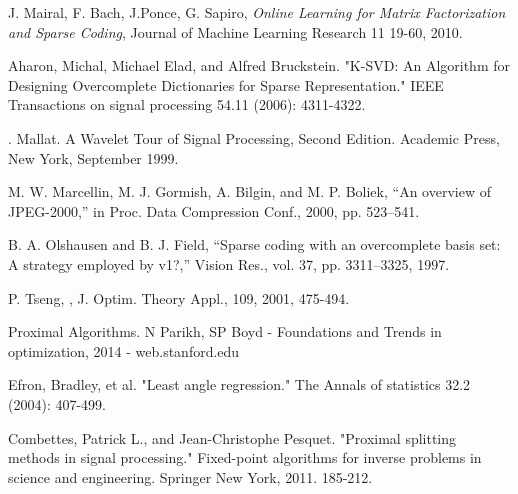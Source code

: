 \documentclass[a4paper,11pt]{article}
\begin{document}
\begin{thebibliography}{9}
  J. Mairal, F. Bach, J.Ponce, G. Sapiro,
  \emph{Online Learning for Matrix Factorization and Sparse Coding},
  Journal of Machine Learning Research 11 19-60, 2010.

  Aharon, Michal, Michael Elad, and Alfred Bruckstein. "K-SVD: An Algorithm for Designing Overcomplete Dictionaries for Sparse Representation." IEEE Transactions on signal processing 54.11 (2006): 4311-4322.

. Mallat. A Wavelet Tour of Signal Processing, Second Edition. Academic Press, New York,
September 1999.


M. W. Marcellin, M. J. Gormish, A. Bilgin, and M. P. Boliek, “An
overview of JPEG-2000,” in Proc. Data Compression Conf., 2000, pp.
523–541.

B. A. Olshausen and B. J. Field, “Sparse coding with an overcomplete
basis set: A strategy employed by v1?,” Vision Res., vol. 37, pp.
3311–3325, 1997.



P. Tseng, , J. Optim. Theory Appl., 109, 2001, 475-494.

Proximal Algorithms.
N Parikh, SP Boyd - Foundations and Trends in optimization, 2014 - web.stanford.edu

Efron, Bradley, et al. "Least angle regression." The Annals of statistics 32.2 (2004): 407-499.

Combettes, Patrick L., and Jean-Christophe Pesquet. "Proximal splitting methods in signal processing." Fixed-point algorithms for inverse problems in science and engineering. Springer New York, 2011. 185-212.

\end{thebibliography}
\end{document}
